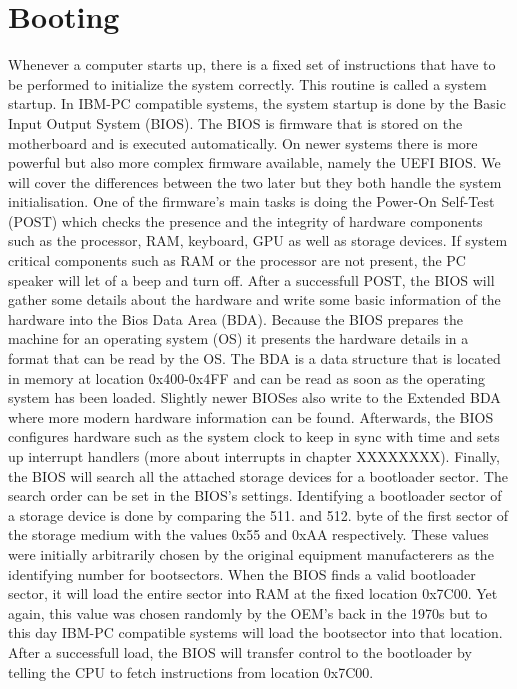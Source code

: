 \section{Booting}

Whenever a computer starts up, there is a fixed set of instructions that
have to be performed to initialize the system correctly. This routine is
called a system startup. In IBM-PC compatible systems, the system startup
is done by the Basic Input Output System (BIOS). The BIOS is firmware
that is stored on the motherboard and is executed automatically. On newer systems there is
more powerful but also more complex firmware available, namely the UEFI BIOS. We
will cover the differences between the two later but they both handle the
system initialisation. One of the firmware's main tasks is doing the Power-On
Self-Test (POST) which checks the presence and the
integrity of hardware components such as the processor, RAM, keyboard,
GPU as well as storage devices. If system critical components such as 
RAM or the processor are not present, the PC speaker will let of a beep
and turn off. After a successfull POST, the BIOS will gather some details
about the hardware and write some basic
information of the hardware into the Bios Data Area (BDA). Because the BIOS
prepares the machine for an operating system (OS) it presents the hardware
details in a format that can be read by the OS.
The BDA is a
data structure that is located in memory at location 0x400-0x4FF and
can be read as soon as the operating system has been loaded. Slightly newer BIOSes also
write to the Extended BDA where more modern hardware information can be
found. Afterwards, the BIOS configures hardware such as the system clock
to keep in sync with time and sets up interrupt handlers (more about
interrupts in chapter XXXXXXXX). Finally, the BIOS will search all the
attached storage devices for a bootloader sector. The search order can be
set in the BIOS's settings. Identifying a bootloader sector of a storage device is
done by comparing the 511. and 512. byte of the first sector of the storage medium
with the values 0x55 and 0xAA respectively. These values were initially
arbitrarily chosen by the original equipment manufacterers as the 
identifying number for bootsectors. When the BIOS finds a valid
bootloader sector, it will load the entire sector into RAM at the fixed
location 0x7C00. Yet again, this value was chosen randomly by the OEM's
back in the 1970s but to this day IBM-PC compatible systems will load
the bootsector into that location. After a successfull load, the BIOS
will transfer control to the bootloader by telling the CPU to fetch
instructions from location 0x7C00.


